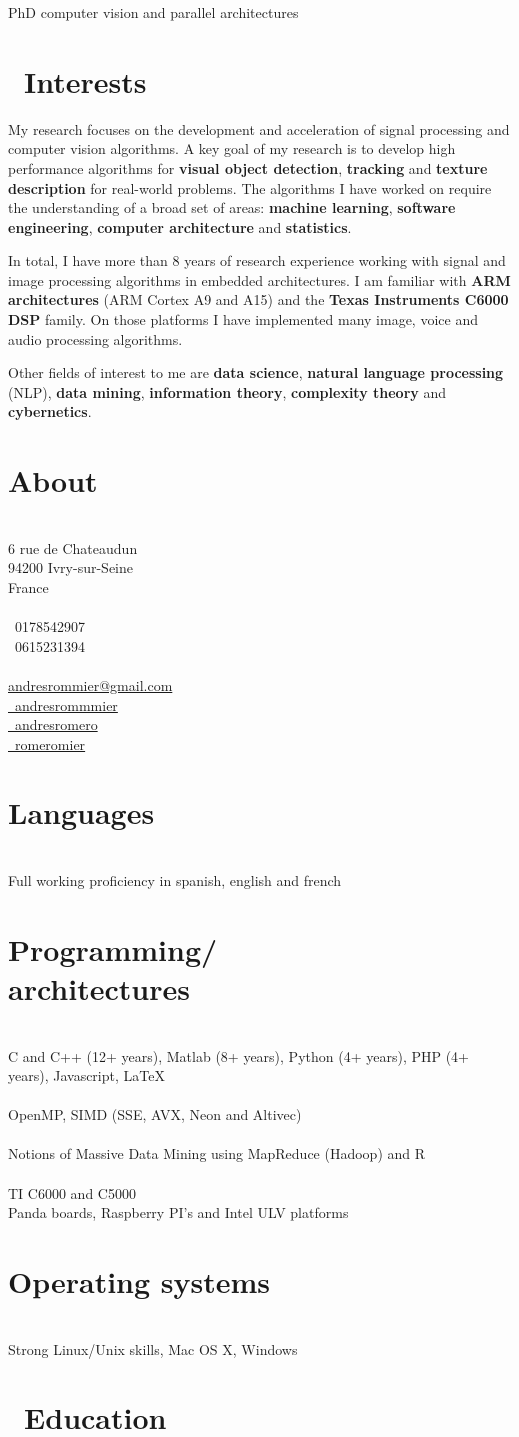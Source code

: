 \documentclass[]{friggeri-cv}
\makeatletter
\def\twitter{{\FA \faTwitter}}
\def\github{{\FA \faGithub}}
\def\linkedin{{\FA \faLinkedin}}
\def\envelope{{\FA \faEnvelopeAlt}}
\def\phone{{\FA \faPhone}}
\def\mobilePhone{{\FA \faMobilePhone}}
\def\flask{{\FA \faFlask}}
\def\pencil{{\FA \faPencil}}
\newcommand{\printaside}{
  \begin{aside}
    \section{About}
      \\
      {6 rue de Chateaudun\\
        94200 Ivry-sur-Seine\\
        France\\
        ~\\
        \phone\ 0178542907\\
        \mobilePhone\ 0615231394\\
        ~\\
        \href{mailto:andresrommier@gmail.com}{\envelope andresrommier@gmail.com}\\
        \href{http://twitter.com/andresrommier}{\twitter\ andresrommmier}\\
        \href{http://andresromero.github.com}{\github\ andresromero}\\
        \href{https://www.linkedin.com/in/romeromier}{\linkedin\ romeromier}}\\
    \section{Languages}\\
      {Full working proficiency in spanish, english and french}\\
    \section{Programming/ \\ architectures}\\
      {C and C++ (12+ years), Matlab (8+ years), Python (4+ years), PHP (4+ years), Javascript, {\stdfont \LaTeX} }\\
      ~\\
      {OpenMP, SIMD (SSE, AVX, Neon and Altivec)}\\
      ~\\
      {Notions of Massive Data Mining using MapReduce (Hadoop) and R}\\
      ~\\
      {TI C6000 and C5000}\\
      {Panda boards, Raspberry PI's and Intel ULV platforms}\\
    \section{Operating systems}\\
      {Strong Linux/Unix skills, Mac OS X, Windows}\\
  \end{aside}
}
\makeatother
\begin{document}
       {PhD computer vision and parallel architectures}


\section{{\flask}\ Interests}

My research focuses on the development and acceleration of signal processing and computer vision algorithms. A key goal of my research is to develop high performance algorithms for \textbf{visual object detection}, \textbf{tracking} and \textbf{texture description} for real-world problems. The algorithms I have worked on require the understanding of a broad set of areas: \textbf{machine learning}, \textbf{software engineering}, \textbf{computer architecture} and \textbf{statistics}.

In total, I have more than 8 years of research experience working with signal and image processing algorithms in embedded architectures. I am familiar with \textbf{ARM architectures} (ARM Cortex A9 and A15) and the \textbf{Texas Instruments C6000 DSP} family. On those platforms I have implemented many image, voice and audio processing algorithms.

Other fields of interest to me are \textbf{data science}, \textbf{natural language processing} (NLP), \textbf{data mining}, \textbf{information theory}, \textbf{complexity theory} and \textbf{cybernetics}.

\printaside

\section{{\pencil}\ Education}
\end{document}
